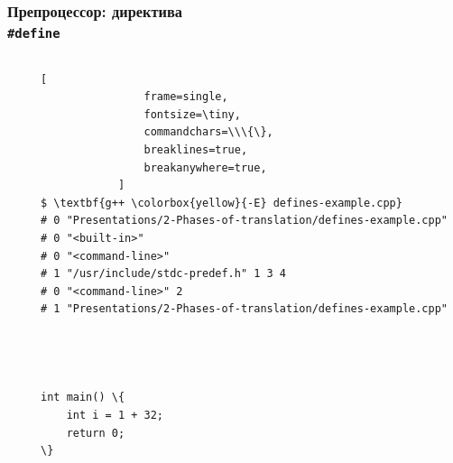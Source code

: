 \documentclass[compress]{beamer}
\begin{document}
\begin{frame}[fragile]

    \frametitle{Препроцессор: директива \\ \texttt{\#define}}

    \begin{columns}[T]

        \begin{column}{0.5\textwidth}


        \end{column}

        \begin{column}{0.5\textwidth}

            \begin{Verbatim}[
                frame=single,
                fontsize=\tiny,
                commandchars=\\\{\},
                breaklines=true,
                breakanywhere=true,
            ]
$ \textbf{g++ \colorbox{yellow}{-E} defines-example.cpp}
# 0 "Presentations/2-Phases-of-translation/defines-example.cpp"
# 0 "<built-in>"
# 0 "<command-line>"
# 1 "/usr/include/stdc-predef.h" 1 3 4
# 0 "<command-line>" 2
# 1 "Presentations/2-Phases-of-translation/defines-example.cpp"




int main() \{
    int i = 1 + 32;
    return 0;
\}
            \end{Verbatim}

        \end{column}

    \end{columns}

\end{frame}
\end{document}
